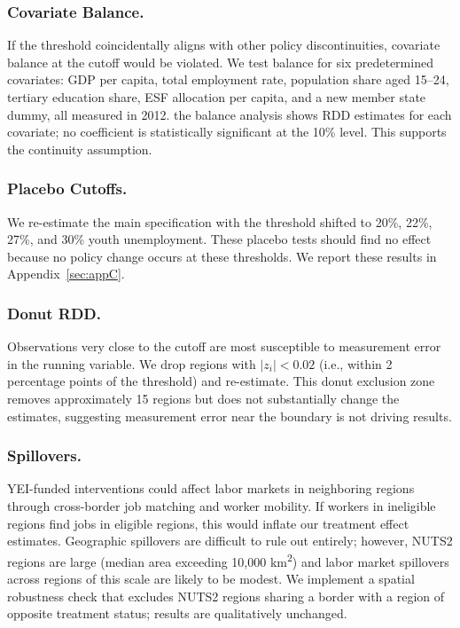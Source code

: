 \documentclass[12pt]{article}
\begin{document}
\subsubsection*{Covariate Balance.} If the threshold coincidentally aligns with other policy discontinuities, covariate balance at the cutoff would be violated. We test balance for six predetermined covariates: GDP per capita, total employment rate, population share aged 15--24, tertiary education share, ESF allocation per capita, and a new member state dummy, all measured in 2012. the balance analysis shows RDD estimates for each covariate; no coefficient is statistically significant at the 10\% level. This supports the continuity assumption.

\subsubsection*{Placebo Cutoffs.} We re-estimate the main specification with the threshold shifted to 20\%, 22\%, 27\%, and 30\% youth unemployment. These placebo tests should find no effect because no policy change occurs at these thresholds. We report these results in Appendix~\ref{sec:appC}.

\subsubsection*{Donut RDD.} Observations very close to the cutoff are most susceptible to measurement error in the running variable. We drop regions with $|z_i| < 0.02$ (i.e., within 2 percentage points of the threshold) and re-estimate. This donut exclusion zone removes approximately 15 regions but does not substantially change the estimates, suggesting measurement error near the boundary is not driving results.

\subsubsection*{Spillovers.} YEI-funded interventions could affect labor markets in neighboring regions through cross-border job matching and worker mobility. If workers in ineligible regions find jobs in eligible regions, this would inflate our treatment effect estimates. Geographic spillovers are difficult to rule out entirely; however, NUTS2 regions are large (median area exceeding 10,000 km\textsuperscript{2}) and labor market spillovers across regions of this scale are likely to be modest. We implement a spatial robustness check that excludes NUTS2 regions sharing a border with a region of opposite treatment status; results are qualitatively unchanged.
\end{document}
